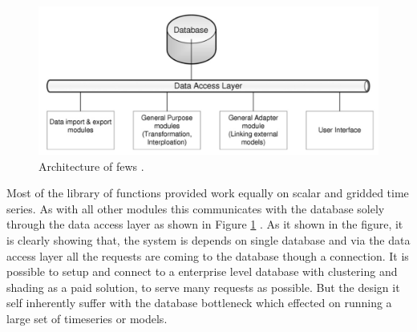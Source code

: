 \begin{figure}[htp]
    \centering
    \includegraphics[width=1.0\textwidth]{lit/fews/Architecture-of-Delft-FEWS-showing-the-data-base-the-data-access-layers-and-examples-of_W640.png}
    \caption[Architecture of \acrshort{fews}]{Architecture of \acrshort{fews} \cite{Werner2013TheSystem}.}
    \label{fi:fews_data_layer}
\end{figure}
Most of the library of functions provided work equally on scalar and gridded time series. As with all other modules this communicates with the database solely through the data access layer as shown in Figure \ref{fi:fews_data_layer} \cite{Werner2013TheSystem}. As it shown in the figure, it is clearly showing that, the system is depends on single database and via the data access layer all the requests are coming to the database though a connection. It is possible to setup and connect to a enterprise level database with clustering and shading as a paid solution, to serve many requests as possible. But the design it self inherently suffer with the database bottleneck which effected on running a large set of timeseries or models.

